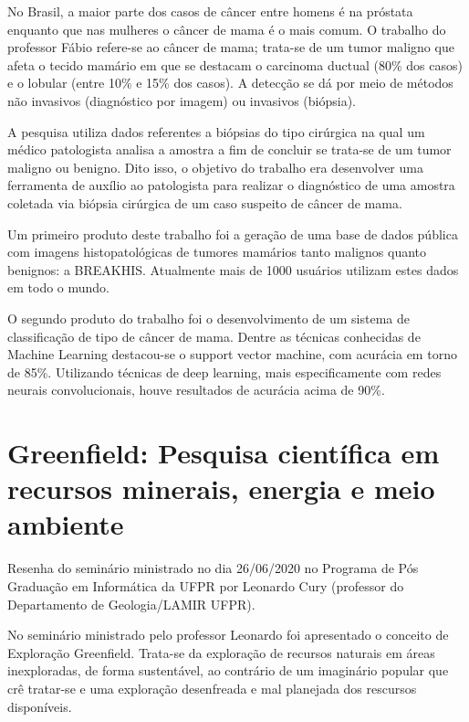 \documentclass[
	12pt,				%
	openright,			%
	twoside,			%
	a4paper,			%
	english,			%
	brazil,				%
	svgnames
	]{abntex2}\usepackage[]{graphicx}\usepackage[]{color}
\begin{document}
No Brasil, a maior parte dos casos de câncer entre homens é na próstata enquanto que nas mulheres o câncer de mama é o mais comum. O trabalho do professor Fábio refere-se ao câncer de mama; trata-se de um tumor maligno que afeta o tecido mamário em que se destacam o carcinoma ductual (80\% dos casos) e o lobular (entre 10\% e 15\% dos casos). A detecção se dá por meio de métodos não invasivos (diagnóstico por imagem) ou invasivos (biópsia).

A pesquisa utiliza dados referentes a biópsias do tipo cirúrgica na qual um médico patologista analisa a amostra a fim de concluir se trata-se de um tumor maligno ou benigno. Dito isso, o objetivo do trabalho era desenvolver uma ferramenta de auxílio ao patologista para realizar o diagnóstico de uma amostra coletada via biópsia cirúrgica de um caso suspeito de câncer de mama.

Um primeiro produto deste trabalho foi a geração de uma base de dados pública com imagens histopatológicas de tumores mamários tanto malignos quanto benignos: a BREAKHIS. Atualmente mais de 1000 usuários utilizam estes dados em todo o mundo.

O segundo produto do trabalho foi o desenvolvimento de um sistema de classificação de tipo de câncer de mama. Dentre as técnicas conhecidas de Machine Learning destacou-se o support vector machine, com acurácia em torno de 85\%. Utilizando técnicas de deep learning, mais especificamente com redes neurais convolucionais, houve resultados de acurácia acima de 90\%.

\chapter{Greenfield: Pesquisa científica em recursos minerais, energia e meio ambiente}
\label{cap:res11}


Resenha do seminário ministrado no dia 26/06/2020 no Programa de Pós Graduação em Informática da UFPR por Leonardo Cury (professor do Departamento de Geologia/LAMIR UFPR).

No seminário ministrado pelo professor Leonardo foi apresentado o conceito de Exploração Greenfield. Trata-se da exploração de recursos naturais em áreas inexploradas, de forma sustentável, ao contrário de um imaginário popular que crê tratar-se e uma exploração desenfreada e mal planejada dos rescursos disponíveis.
\end{document}
